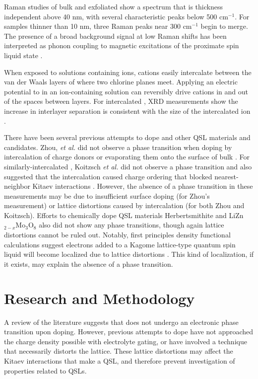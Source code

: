 \documentclass[11pt]{article}
\begin{document}
Raman studies of bulk and exfoliated \rucl show a spectrum that is thickness independent above 40 nm, with several characteristic peaks below 500 cm$^{-1}$. For samples thinner than 10 nm, three Raman peaks near 300 cm$^{-1}$ begin to merge. The presence of a broad background signal at low Raman shifts has been interpreted as phonon coupling to magnetic excitations of the proximate spin liquid state \cite{Zhou2018,Du2019}.

When exposed to solutions containing ions, cations easily intercalate between the van der Waals layers of \rucl where two chlorine planes meet. Applying an electric potential to \rucl in an ion-containing solution can reversibly drive cations in and out of the spaces between layers. For intercalated \ruclnospace , XRD measurements show the increase in interlayer separation is consistent with the size of the intercalated ion \cite{Steffen1986,Schollhorn1983}.

There have been several previous attempts to dope \rucl and other QSL materials and candidates. Zhou, \textit{et al.} did not observe a phase transition when doping \rucl by intercalation of charge donors or evaporating them onto the surface of bulk \rucl \cite{Zhou2016}. For similarly-intercalated \ruclnospace , Koitzsch \textit{et al.} did not observe a phase transition and also suggested that the intercalation caused charge ordering that blocked nearest-neighbor Kitaev interactions \cite{Koitzsch2017a}. However, the absence of a phase transition in these measurements may be due to insufficient surface doping (for Zhou's measurement) or lattice distortions caused by intercalation (for both Zhou and Koitzsch). Efforts to chemically dope QSL materials Herbertsmithite \cite{Kelly2016} and LiZn$_{2-x}$Mo$_{3}$O$_{8}$ \cite{Sheckelton2015} also did not show any phase transitions, though again lattice distortions cannot be ruled out. Notably, first principles density functional calculations suggest electrons added to a Kagome lattice-type quantum spin liquid will become localized due to lattice distortions \cite{Liu2018}. This kind of localization, if it exists, may explain the absence of a phase transition.


\section{Research and Methodology}

A review of the literature suggests that \rucl does not undergo an electronic phase transition upon doping. However, previous attempts to dope \rucl have not approached the charge density possible with electrolyte gating, or have involved a technique that necessarily distorts the lattice. These lattice distortions may affect the Kitaev interactions that make \rucl a QSL, and therefore prevent investigation of properties related to QSLs.
\end{document}
